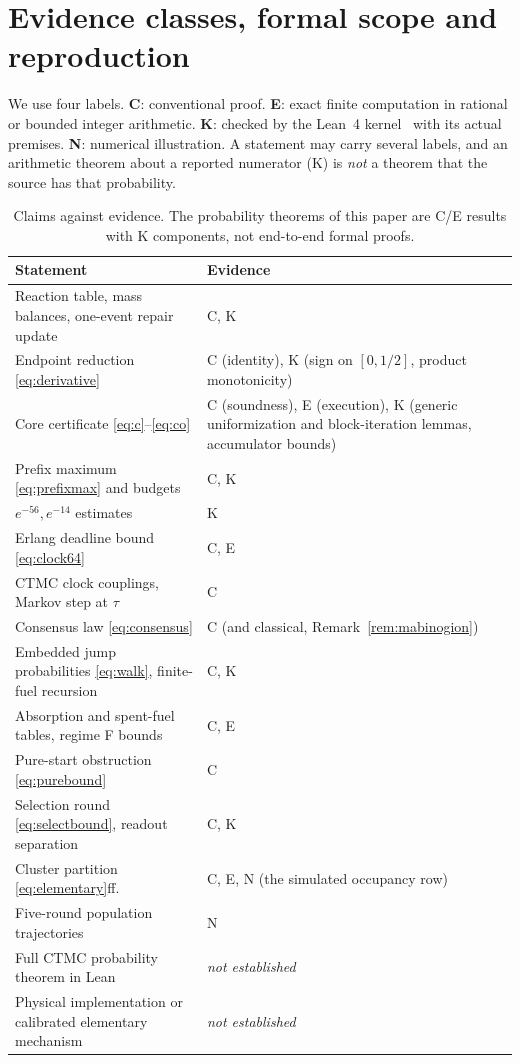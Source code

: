 \documentclass[11pt,a4paper]{article}
\theoremstyle{plain}
\theoremstyle{definition}
\theoremstyle{remark}
\begin{document}
\appendix

\section{Evidence classes, formal scope and reproduction}\label{app:evidence}

We use four labels. \textbf{C}: conventional proof. \textbf{E}: exact finite computation
in rational or bounded integer arithmetic. \textbf{K}: checked by the Lean~4
kernel~\citep{demoura2021,mathlib2020} with its actual premises. \textbf{N}: numerical
illustration. A statement may carry several labels, and an arithmetic theorem about a
reported numerator (K) is \emph{not} a theorem that the source has that probability.

\begin{table}[htbp]\centering\small
\begin{tabular}{@{}LM@{}}\toprule
Statement & Evidence\\\midrule
Reaction table, mass balances, one-event repair update & C, K\\
Endpoint reduction \eqref{eq:derivative} & C (identity), K (sign on $[0,1/2]$,
 product monotonicity)\\
Core certificate \eqref{eq:c}--\eqref{eq:co} & C (soundness), E (execution),
 K (generic uniformization and block-iteration lemmas, accumulator bounds)\\
Prefix maximum \eqref{eq:prefixmax} and budgets & C, K\\
$e^{-56},e^{-14}$ estimates & K\\
Erlang deadline bound \eqref{eq:clock64} & C, E\\
CTMC clock couplings, Markov step at $\tau$ & C\\
Consensus law \eqref{eq:consensus} & C (and classical, Remark~\ref{rem:mabinogion})\\
Embedded jump probabilities \eqref{eq:walk}, finite-fuel recursion & C, K\\
Absorption and spent-fuel tables, regime F bounds & C, E\\
Pure-start obstruction \eqref{eq:purebound} & C\\
Selection round \eqref{eq:selectbound}, readout separation & C, K\\
Cluster partition \eqref{eq:elementary}ff. & C, E, N (the simulated occupancy row)\\
Five-round population trajectories & N\\
Full CTMC probability theorem in Lean & \emph{not established}\\
Physical implementation or calibrated elementary mechanism & \emph{not established}\\
\bottomrule
\end{tabular}
\caption{Claims against evidence. The probability theorems of this paper are C/E results
with K components, not end-to-end formal proofs.}\label{tab:evidence}
\end{table}
\end{document}
